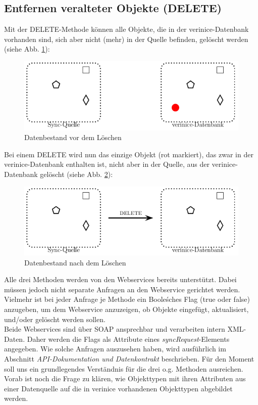\documentclass[a4paper,10pt]{book}
\begin{document}
\subsection{Entfernen veralteter Objekte (DELETE)}
Mit der \textsc{DELETE}-Methode können alle Objekte, die in der verinice-Datenbank vorhanden sind,
sich aber nicht (mehr) in der Quelle befinden, gelöscht werden (siehe Abb. \ref{Datenbestand vor dem Loeschen}):
\newline
\begin{figure}[htb!]
  \centering
  \includegraphics[scale=.7]{Screenshot/SyncAPI_pre_DELETE.png}
  \caption{\label{Datenbestand vor dem Loeschen} Datenbestand vor dem Löschen}
\end{figure}
\newline
Bei einem \textsc{DELETE} wird nun das einzige Objekt (rot markiert), das zwar in der verinice-Datenbank enthalten
ist, nicht aber in der Quelle, aus der verinice-Datenbank gelöscht (siehe Abb. \ref{Datenbestand nach dem Loeschen}):
\newline
\begin{figure}[htb!]
  \centering
  \includegraphics[scale=.7]{Screenshot/SyncAPI_post_DELETE.png}
  \caption{\label{Datenbestand nach dem Loeschen} Datenbestand nach dem Löschen}
\end{figure}
\newline
Alle drei Methoden werden von den Webservices bereits unterstützt. Dabei müssen jedoch nicht separate Anfragen an
den Webservice gerichtet werden. Vielmehr ist bei jeder Anfrage je Methode ein Boole\'sches Flag (true oder false) anzugeben, um dem Webservice anzuzeigen, ob Objekte eingefügt, aktualisiert, und/oder gelöscht werden sollen.
\newline\\
Beide Webservices sind über SOAP ansprechbar und verarbeiten intern XML-Daten. Daher werden die Flags als Attribute eines
\textit{syncRequest}-Elements angegeben. Wie solche Anfragen auszusehen haben, wird ausführlich im Abschnitt
\textit{API-Dokumentation und Datenkontrakt} beschrieben. Für den Moment soll uns ein grundlegendes Verständnis
für die drei o.g. Methoden ausreichen.
\newline\\
Vorab ist noch die Frage zu klären, wie Objekttypen mit ihren Attributen aus einer Datenquelle auf die in
verinice vorhandenen Objekttypen abgebildet werden.
\end{document}
